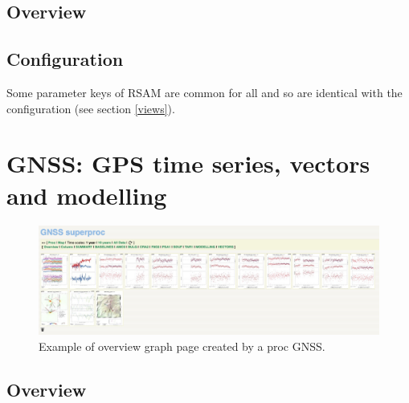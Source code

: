 \subsection{Overview}

\subsection{Configuration}

Some parameter keys of RSAM are common for all  and  so are identical with the  configuration (see section \ref{views}).




\newpage
\section{GNSS: GPS time series, vectors and modelling}


\begin{figure}
\includegraphics[width=\textwidth]{figures/gnss_overview.png}
\caption{Example of overview graph page created by a proc GNSS.}
\end{figure}

\subsection{Overview}

